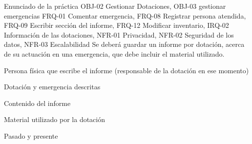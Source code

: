 {\reportauthors}
{Enunciado de la práctica}
{OBJ-02 Gestionar Dotaciones, OBJ-03 gestionar emergencias}
{FRQ-01 Comentar emergencia, FRQ-08 Registrar persona atendida, FRQ-09 Escribir sección del informe, FRQ-12 Modificar inventario, IRQ-02 Información de las dotaciones, NFR-01 Privacidad, NFR-02 Seguridad de los datos, NFR-03 Escalabilidad}
{Se deberá guardar un informe por dotación, acerca de su actuación en una emergencia, que debe incluir el material utilizado.}
{
\item{Persona física que escribe el informe (responsable de la dotación en ese momento)}
\item{Dotación y emergencia descritas}
\item{Contenido del informe}
\item{Material utilizado por la dotación}
}
{Pasado y presente}

